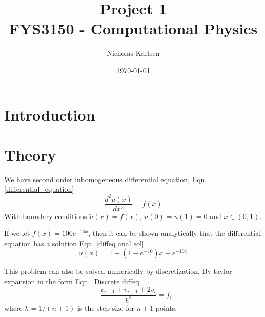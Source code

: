 \documentclass[11pt,a4paper, twocolumn]{article}
\begin{document}
\title{Project 1\\
\normalsize{FYS3150 - Computational Physics}\\}

\author{Nicholas Karlsen}


\date{\today}%



\section{Introduction \label{sect:intro}}

\section{Theory \label{sect:theory}}

  We have second order inhomogeneous differential equation, Eqn. \ref{differential_equation}
  \begin{equation}
    \label{differential_equation}
    \frac{d^2u(x)}{dx^2} = f(x)
  \end{equation}
  With boundary conditions $\ddot{u}(x) = f(x)$, $u(0) = u(1) = 0$ and $x \in (0, 1)$.

  If we let $f(x) = 100e^{-10x}$, then it can be shown analytically that the differential equation has a solution Eqn. \ref{diffeq anal sol}
  \begin{equation}
    \label{diffeq anal sol}
    u(x) = 1 - (1 - e^{-10})x - e^{-10x}
  \end{equation}

  This problem can also be solved numerically by discretization. By taylor expansion in the form Eqn. \ref{Discrete diffeq}
  \begin{equation}
    \label{Discrete diffeq}
    - \frac{v_{i+1} + v_{i-1} + 2v_i}{h^2} = f_i
  \end{equation}
  where $h = 1/(n+1)$ is the step size for $n+1$ points.
\end{document}
